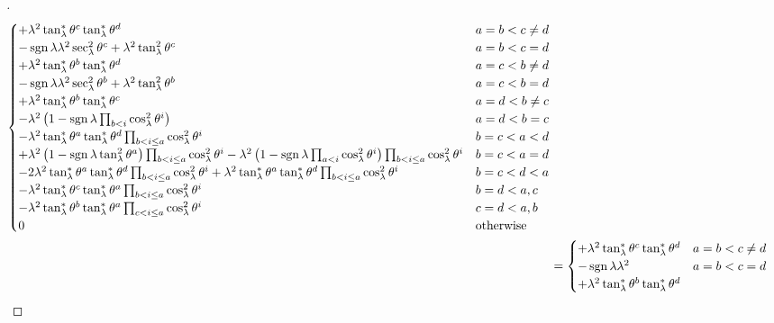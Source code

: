 \documentclass[../main.tex]{subfiles}
\begin{document}
\begin{proof}[]
\begin{align*}
\begin{cases}
+\lambda^2\tan_\lambda^\ast\tensor{\theta}{^c}\tan_\lambda^\ast\tensor{\theta}{^d}
&\text{$a=b<c\ne d$}\\
-\sign{\lambda}\lambda^2\sec_\lambda^2\tensor{\theta}{^c}
+\lambda^2\tan_\lambda^2\tensor{\theta}{^c}
&\text{$a=b<c=d$}\\
+\lambda^2\tan_\lambda^\ast\tensor{\theta}{^b}\tan_\lambda^\ast\tensor{\theta}{^d}
&\text{$a=c<b\ne d$}\\
-\sign{\lambda}\lambda^2\sec^2_\lambda\tensor{\theta}{^b}
+\lambda^2\tan_\lambda^2\tensor{\theta}{^b}
&\text{$a=c<b=d$}\\
+\lambda^2\tan_\lambda^\ast\tensor{\theta}{^b}\tan_\lambda^\ast\tensor{\theta}{^c}
&\text{$a=d<b\ne c$}\\
-\lambda^2
\left(
1-\sign{\lambda}\prod_{b<i}\cos_\lambda^2\tensor{\theta}{^i}
\right)
&\text{$a=d<b=c$}\\
-\lambda^2\tan_\lambda^\ast\tensor{\theta}{^a}\tan_\lambda^\ast\tensor{\theta}{^d}\prod_{b<i\le a}\cos_\lambda^2\tensor{\theta}{^i}
&\text{$b=c<a<d$}\\
+\lambda^2\left(1-\sign{\lambda}\tan_\lambda^2\tensor{\theta}{^a}\right)\prod_{b<i\le a}{\cos_\lambda^2\tensor{\theta}{^i}}
-\lambda^2
\left(
1-\sign{\lambda}\prod_{a<i}\cos_\lambda^2\tensor{\theta}{^i}
\right)
\prod_{b<i\le a}\cos_\lambda^2\tensor{\theta}{^i}
&\text{$b=c<a=d$}\\
-2\lambda^2\tan_\lambda^\ast\tensor{\theta}{^a}\tan_\lambda^\ast\tensor{\theta}{^d}\prod_{b<i\le a}{\cos_\lambda^2\tensor{\theta}{^i}}
+\lambda^2\tan_\lambda^\ast\tensor{\theta}{^a}\tan_\lambda^\ast\tensor{\theta}{^d}\prod_{b<i\le a}\cos_\lambda^2\tensor{\theta}{^i}
&\text{$b=c<d<a$}\\
-\lambda^2\tan_\lambda^\ast\tensor{\theta}{^c}\tan_\lambda^\ast\tensor{\theta}{^a}\prod_{b<i\le a}\cos_\lambda^2\tensor{\theta}{^i}
&\text{$b=d<a,c$}\\
-\lambda^2\tan_\lambda^\ast\tensor{\theta}{^b}\tan_\lambda^\ast\tensor{\theta}{^a}\prod_{c<i\le a}\cos_\lambda^2\tensor{\theta}{^i}
&\text{$c=d<a,b$}\\
0&\text{otherwise}\\
\end{cases}\\
&=\begin{cases}
+\lambda^2\tan_\lambda^\ast\tensor{\theta}{^c}\tan_\lambda^\ast\tensor{\theta}{^d}
&\text{$a=b<c\ne d$}\\
-\sign{\lambda}\lambda^2
&\text{$a=b<c=d$}\\
+\lambda^2\tan_\lambda^\ast\tensor{\theta}{^b}\tan_\lambda^\ast\tensor{\theta}{^d}

\end{cases}
\end{align*}
\end{proof}
\end{document}
